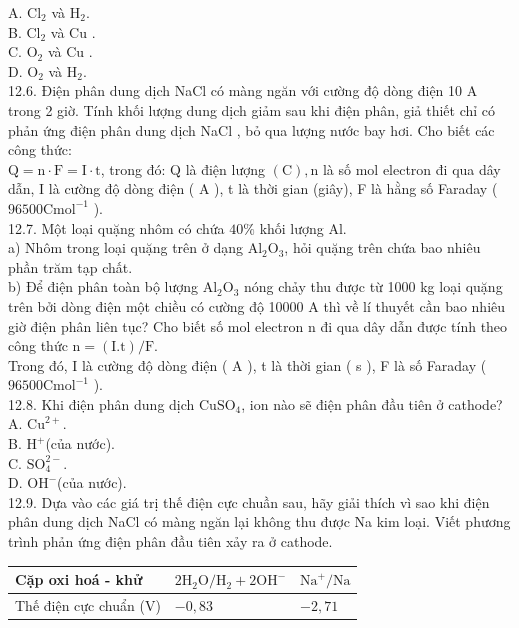 \documentclass[10pt]{article}
\begin{document}
A. $\mathrm{Cl}_{2}$ và $\mathrm{H}_{2}$.\\
B. $\mathrm{Cl}_{2}$ và Cu .\\
C. $\mathrm{O}_{2}$ và Cu .\\
D. $\mathrm{O}_{2}$ và $\mathrm{H}_{2}$.\\
12.6. Điện phân dung dịch NaCl có màng ngăn với cường độ dòng điện 10 A trong 2 giờ. Tính khối lượng dung dịch giảm sau khi điện phân, giả thiết chỉ có phản ứng điện phân dung dịch NaCl , bỏ qua lượng nước bay hơi. Cho biết các công thức:\\
$\mathrm{Q}=\mathrm{n} \cdot \mathrm{F}=\mathrm{I} \cdot \mathrm{t}$, trong đó: Q là điện lượng $(\mathrm{C}), \mathrm{n}$ là số mol electron đi qua dây dẫn, I là cường độ dòng điện ( A ), t là thời gian (giây), F là hằng số Faraday ( $96500 \mathrm{C} \mathrm{mol}^{-1}$ ).\\
12.7. Một loại quặng nhôm có chứa $40 \%$ khối lượng Al.\\
a) Nhôm trong loại quặng trên ở dạng $\mathrm{Al}_{2} \mathrm{O}_{3}$, hỏi quặng trên chứa bao nhiêu phần trăm tạp chất.\\
b) Để điện phân toàn bộ lượng $\mathrm{Al}_{2} \mathrm{O}_{3}$ nóng chảy thu được từ 1000 kg loại quặng trên bởi dòng điện một chiều có cường độ 10000 A thì về lí thuyết cần bao nhiêu giờ điện phân liên tục? Cho biết số mol electron n đi qua dây dẫn được tính theo công thức $\mathrm{n}=(\mathrm{I} . \mathrm{t}) / \mathrm{F}$.\\
Trong đó, I là cường độ dòng điện ( A ), t là thời gian ( s ), F là số Faraday ( $96500 \mathrm{C} \mathrm{mol}^{-1}$ ).\\
12.8. Khi điện phân dung dịch $\mathrm{CuSO}_{4}$, ion nào sẽ điện phân đầu tiên ở cathode?\\
A. $\mathrm{Cu}^{2+}$.\\
B. $\mathrm{H}^{+}$(của nước).\\
C. $\mathrm{SO}_{4}^{2-}$.\\
D. $\mathrm{OH}^{-}$(của nước).\\
12.9. Dựa vào các giá trị thế điện cực chuần sau, hãy giải thích vì sao khi điện phân dung dịch NaCl có màng ngăn lại không thu được Na kim loại. Viết phương trình phản ứng điện phân đầu tiên xảy ra ở cathode.

\begin{center}
\begin{tabular}{|l|l|l|}
\hline
Cặp oxi hoá - khử & $2 \mathrm{H}_{2} \mathrm{O} / \mathrm{H}_{2}+2 \mathrm{OH}^{-}$ & $\mathrm{Na}^{+} / \mathrm{Na}$ \\
\hline
Thế điện cực chuẩn (V) & $-0,83$ & $-2,71$ \\
\hline
\end{tabular}
\end{center}
\end{document}
